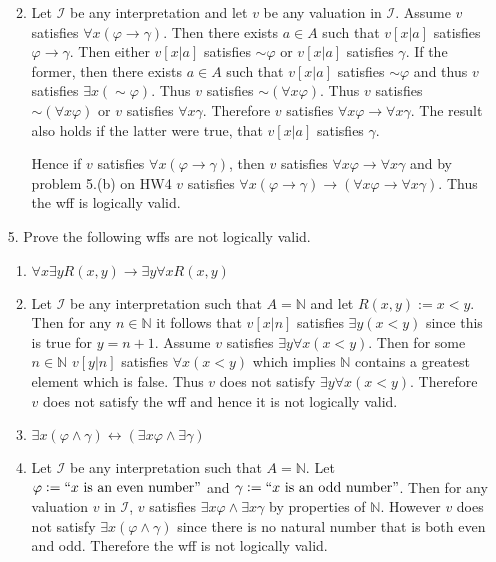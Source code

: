 \documentclass[12pt]{article}
\makeatletter
\theoremstyle{definition}
\theoremstyle{remark}
\renewenvironment{proof}[1][\proofname]{\par
  \pushQED{\qed}%
  \normalfont \topsep6\p@\@plus6\p@\relax
  \list{}{\leftmargin=0mm
          \rightmargin=4mm
          \settowidth{\itemindent}{\itshape#1}%
          \labelwidth=\itemindent
          \parsep=0pt \listparindent=\parindent 
  }
  \item[\hskip\labelsep
        \itshape
    #1\@addpunct{.}]\ignorespaces
}{%
  \popQED\endlist\@endpefalse
}
\let\oldproofname=\proofname
\renewcommand{\proofname}{\bf{\textit{\oldproofname}}}
\makeatother
\begin{document}
\begin{enumerate}[leftmargin=*]
\begin{enumerate}
\begin{proof}
                        Let $\mathcal{I}$ be any interpretation and let $v$ be any valuation in $\mathcal{I}$. Assume $v$ satisfies $\forall x(\varphi\rightarrow\gamma)$. Then there exists $a\in A$ such that $v[x|a]$ satisfies $\varphi\rightarrow\gamma$. Then either $v[x|a]$ satisfies $\sim\varphi$ or $v[x|a]$ satisfies $\gamma$. If the former, then there exists $a\in A$ such that $v[x|a]$ satisfies $\sim \varphi$ and thus $v$ satisfies $\exists x(\sim\varphi)$. Thus $v$ satisfies $\sim(\forall x\varphi)$. Thus $v$ satisfies $\sim(\forall x\varphi)$ or $v$ satisfies $\forall x\gamma$. Therefore $v$ satisfies $\forall x\varphi\rightarrow\forall x\gamma$. The result also holds if the latter were true, that $v[x|a]$ satisfies $\gamma$.\par\hspace{4mm} Hence if $v$ satisfies $\forall x(\varphi\rightarrow\gamma)$, then $v$ satisfies $\forall x\varphi\rightarrow\forall x\gamma$ and by problem 5.(b) on HW4 $v$ satisfies $\forall x(\varphi\rightarrow\gamma)\rightarrow(\forall x\varphi\rightarrow\forall x\gamma)$. Thus the wff is logically valid.
                    \end{proof}
            \end{enumerate}
        \item[5.] Prove the following wffs are not logically valid.\hfill\par 
            \begin{enumerate}
                \item $\forall x\exists y R(x,y)\rightarrow\exists y\forall x R(x,y)$
                    \begin{proof}
                        Let $\mathcal{I}$ be any interpretation such that $A=\mathbb{N}$ and let $R(x,y):=x<y$. Then for any $n\in\mathbb{N}$ it follows that $v[x|n]$ satisfies $\exists y(x<y)$ since this is true for $y=n+1$. Assume $v$ satisfies $\exists y\forall x(x<y)$. Then for some $n\in\mathbb{N}$ $v[y|n]$ satisfies $\forall x(x<y)$ which implies $\mathbb{N}$ contains a greatest element which is false. Thus $v$ does not satisfy $\exists y\forall x(x<y)$. Therefore $v$ does not satisfy the wff and hence it is not logically valid.
                    \end{proof}
                \item $\exists x(\varphi\land\gamma)\leftrightarrow(\exists x\varphi\land\exists\gamma)$
                    \begin{proof}
                        Let $\mathcal{I}$ be any interpretation such that $A=\mathbb{N}$. Let $\varphi:=``x \text{ is an even number''}$ and $\gamma:= ``x \text{ is an odd number''}$. Then for any valuation $v$ in $\mathcal{I}$, $v$ satisfies $\exists x\varphi\land\exists x\gamma$ by properties of $\mathbb{N}$. However $v$ does not satisfy $\exists x(\varphi\land\gamma)$ since there is no natural number that is both even and odd. Therefore the wff is not logically valid.  

\end{proof}
\end{enumerate}
\end{enumerate}
\end{document}
